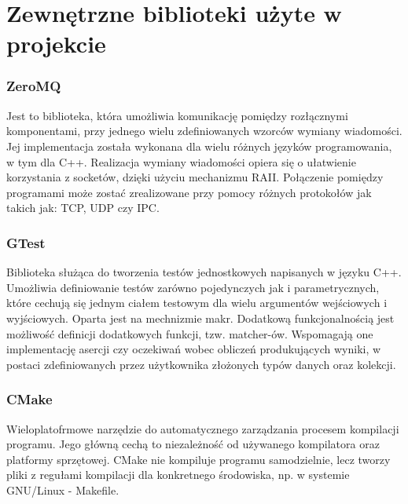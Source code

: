 \chapter{Zewnętrzne biblioteki użyte w projekcie}
\subsection{ZeroMQ}
Jest to biblioteka, która umożliwia komunikację pomiędzy rozłącznymi komponentami, przy jednego wielu zdefiniowanych wzorców wymiany
wiadomości. Jej implementacja została wykonana dla wielu różnych języków programowania, w tym dla C++.
Realizacja wymiany wiadomości opiera się o ułatwienie korzystania z socketów, dzięki użyciu mechanizmu RAII.
Połączenie pomiędzy programami może zostać zrealizowane przy pomocy różnych protokołów jak takich jak: TCP, UDP czy IPC.

\subsection{GTest}
Biblioteka służąca do tworzenia testów jednostkowych napisanych w języku C++. Umożliwia definiowanie testów zarówno
pojedynczych jak i parametrycznych, które cechują się jednym ciałem testowym dla wielu argumentów wejściowych i wyjściowych.
Oparta jest na mechnizmie makr. Dodatkową funkcjonalnością jest możliwość definicji dodatkowych funkcji, tzw. matcher-ów.
Wspomagają one implementację asercji czy oczekiwań wobec obliczeń produkujących wyniki, w postaci zdefiniowanych przez użytkownika
złożonych typów danych oraz kolekcji.

\newpage
\subsection{CMake}
Wieloplatofrmowe narzędzie do automatycznego zarządzania procesem kompilacji programu.
Jego główną cechą to niezależność od używanego kompilatora oraz platformy sprzętowej. CMake nie kompiluje programu
samodzielnie, lecz tworzy pliki z regułami kompilacji dla konkretnego środowiska, np. w systemie GNU/Linux - Makefile.
\cite{CMAKE}

